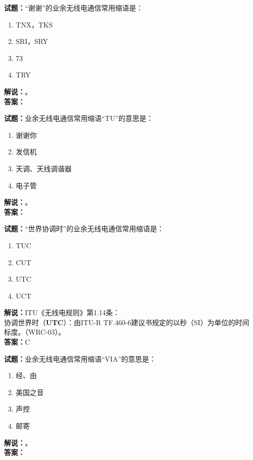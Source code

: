\documentclass{ctexbook}
\begin{document}
\noindent\textbf{试题：}“谢谢”的业余无线电通信常用缩语是：
\begin{enumerate}[leftmargin=3em]
\item TNX，TKS
\item SRI，SRY
\item 73
\item TRY
\end{enumerate}
\noindent\textbf{解说：}\textbf{}。\\\noindent\textbf{答案：}

\bigskip




\noindent\textbf{试题：}业余无线电通信常用缩语“TU”的意思是：
\begin{enumerate}[leftmargin=3em]
\item 谢谢你
\item 发信机
\item 天调、天线调谐器
\item 电子管
\end{enumerate}
\noindent\textbf{解说：}\textbf{}。\\\noindent\textbf{答案：}

\bigskip




\noindent\textbf{试题：}“世界协调时”的业余无线电通信常用缩语是：
\begin{enumerate}[leftmargin=3em]
\item TUC
\item CUT
\item UTC
\item UCT
\end{enumerate}
\noindent\textbf{解说：}ITU《无线电规则》第1.14条：\\协调世界时（\textbf{UTC}）：由ITU-R TF.460-6建议书规定的以秒（SI）为单位的时间标度。（WRC-03）。\\\noindent\textbf{答案：}C

\bigskip




\noindent\textbf{试题：}业余无线电通信常用缩语“VIA”的意思是：
\begin{enumerate}[leftmargin=3em]
\item 经、由
\item 美国之音%
\item 声控
\item 邮寄
\end{enumerate}
\noindent\textbf{解说：}\textbf{}。\\\noindent\textbf{答案：}
\end{document}
